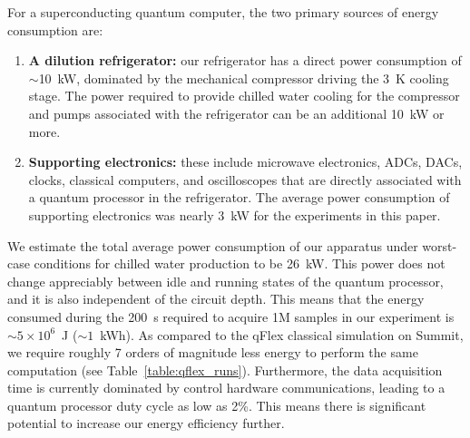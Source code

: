 For a superconducting quantum computer, the two primary sources of energy consumption are: 
\begin{enumerate}
\item \textbf{A dilution refrigerator:} our refrigerator has a direct power consumption of $\sim$10~kW, dominated by the mechanical compressor driving the 3~K cooling stage.  The power required to provide chilled water cooling for the compressor and pumps associated with the refrigerator can be an additional 10~kW or more.
\item \textbf{Supporting electronics:} these include microwave electronics, ADCs, DACs, clocks, classical computers, and oscilloscopes that are directly associated with a quantum processor in the refrigerator.  The average power consumption of supporting electronics was nearly 3~kW for the experiments in this paper.
\end{enumerate}

We estimate the total average power consumption of our apparatus under worst-case conditions for chilled water production to be 26~kW.  This power does not change appreciably between idle and running states of the quantum processor, and it is also independent of the circuit depth.  This means that the energy consumed during the 200~s required to acquire 1M samples in our experiment is $\sim5\times10^6$~J ($\sim1$~kWh).  As compared to the qFlex classical simulation on Summit, we require roughly 7 orders of magnitude less energy to perform the same computation (see Table~\ref{table:qflex_runs}).  Furthermore, the data acquisition time is currently dominated by control hardware communications, leading to a quantum processor duty cycle as low as 2\%.  This means there is significant potential to increase our energy efficiency further.
